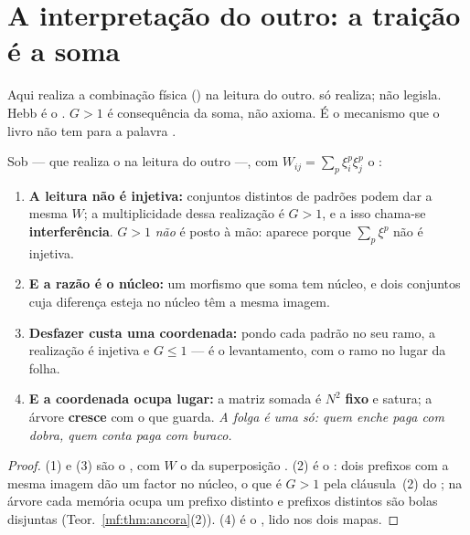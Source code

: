 \documentclass[../livro.tex]{subfiles}
\begin{document}
\section{A interpretação do outro: a traição é a soma}\label{mf:outro}

\noindent Aqui  realiza a combinação física () na
leitura do outro.  só realiza; não legisla. Hebb é o
. $G>1$ é consequência da soma, não axioma. É o mecanismo
que o livro não tem para a palavra .

\begin{teorema}\label{mf:thm:outro}
Sob  --- que realiza o  na leitura do outro ---,
com $W_{ij}=\sum_{p}\xi^p_i\xi^p_j$ o :
\begin{enumerate}\itemsep3pt
\item[(1)] \textbf{A leitura não é injetiva:} conjuntos distintos de padrões
podem dar a mesma $W$; a multiplicidade dessa realização é $G>1$, e a isso
chama-se \textbf{interferência}. $G>1$ \emph{não} é posto à mão: aparece porque
$\sum_p\xi^p$ não é injetiva.
\item[(2)] \textbf{E a razão é o núcleo:} um morfismo que soma tem núcleo, e
dois conjuntos cuja diferença esteja no núcleo têm a mesma imagem.
\item[(3)] \textbf{Desfazer custa uma coordenada:} pondo cada padrão no seu
ramo, a realização é injetiva e $G\le1$ --- é o levantamento, com o ramo no
lugar da folha.
\item[(4)] \textbf{E a coordenada ocupa lugar:} a matriz somada é $N^2$
\textbf{fixo} e satura; a árvore \textbf{cresce} com o que guarda. \emph{A folga
é uma só: quem enche paga com dobra, quem conta paga com buraco.}
\end{enumerate}
\end{teorema}

\begin{proof}
(1) e (3) são o ,
com $W$ o  da superposição .
(2) é o : dois prefixos com a mesma imagem dão um factor no núcleo, o que é
$G>1$ pela cláusula~(2) do ; na árvore cada memória ocupa um prefixo distinto e prefixos
distintos são bolas disjuntas (Teor.~\ref{mf:thm:ancora}(2)). (4) é o
, lido nos dois mapas.
\end{proof}
\end{document}
